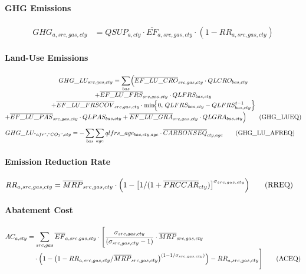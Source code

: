 \paragraph{GHG Emissions}
\begin{align}
  GHG_{a,src,gas,cty}
  &= QSUP_{a,cty}
     \cdot
     \overline{EF}_{a,src,gas,cty}
     \cdot
     (1 - RR_{a,src,gas,cty})
  \tag{GHGEQ}\label{eq:GHGEQ}
\end{align}

\paragraph{Land-Use Emissions}
\begin{multline}
  GHG\_LU_{src,gas,cty}
  =
  \sum_{bas}\Bigl(
    \overline{EF\_LU\_CRO}_{src,gas,cty}\cdot QLCRO_{bas,cty}
    \\[-0.3em]
    + \overline{EF\_LU\_FRS}_{src,gas,cty}\cdot QLFRS_{bas,cty}
    \\[-0.3em]
    + \overline{EF\_LU\_FRSCOV}_{src,gas,cty}
      \cdot \min\!\Bigl\{
        0,\,
        QLFRS_{bas,cty}-QLFRS^{t-1}_{bas,cty}
      \Bigr\}
    \\[-0.3em]
    + \overline{EF\_LU\_PAS}_{src,gas,cty}\cdot QLPAS_{bas,cty}
    + \overline{EF\_LU\_GRA}_{src,gas,cty}\cdot QLGRA_{bas,cty}
  \Bigr)
  \tag{GHG\_LUEQ}\label{eq:GHG_LUEQ}
\end{multline}
\begin{align}
  GHG\_LU_{"afr","CO_2",cty}
  &=
  - \sum_{bas}\sum_{age}
      qlfrs\_age_{bas,cty,age}
      \cdot \overline{CARBONSEQ}_{cty,age}
  \tag{GHG\_LU\_AFREQ}\label{eq:GHG_LU_AFREQ}
\end{align}

\paragraph{Emission Reduction Rate}
\begin{align}
  RR_{a,src,gas,cty}
  &= \overline{MRP}_{src,gas,cty}
     \cdot
     \Bigl(
       1 -
       \bigl[
         1 / (1 + \overline{PRCCAR}_{cty})
       \bigr]^{\sigma_{src,gas,cty}}
     \Bigr)
  \tag{RREQ}\label{eq:RREQ}
\end{align}

\paragraph{Abatement Cost}
\begin{align}
  AC_{a,cty}
  &= \sum_{src,gas}
     \overline{EF}_{a,src,gas,cty}
     \cdot
     \Biggl[
       \frac{\sigma_{src,gas,cty}}
            {(\sigma_{src,gas,cty}-1)}
       \cdot
       \overline{MRP}_{src,gas,cty}
       \nonumber\\[-0.3em]
  &\quad
       \cdot
       \Bigl(
         1 -
         \bigl(
           1 -
           RR_{a,src,gas,cty} /
           \overline{MRP}_{src,gas,cty}
         \bigr)^{(1 - 1/\sigma_{src,gas,cty})}
       \Bigr)
       - RR_{a,src,gas,cty}
     \Biggr]
  \tag{ACEQ}\label{eq:ACEQ}
\end{align}

